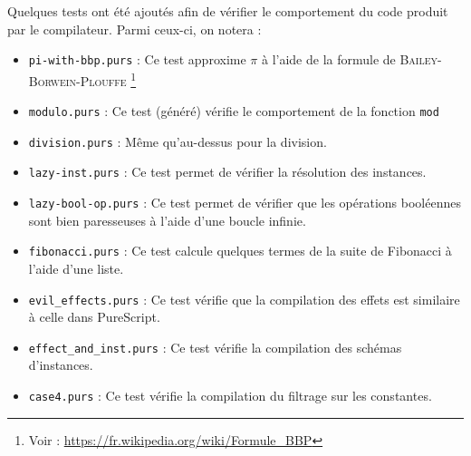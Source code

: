 \documentclass[french, 12pt]{article}
\newcommand{\ps}{\textsf{PureScript}}
\begin{document}
Quelques tests ont été ajoutés afin de vérifier le comportement du code produit
par le compilateur. Parmi ceux-ci, on notera :
\begin{itemize}
    \item \texttt{pi-with-bbp.purs} : Ce test approxime $\pi$ à l'aide de la
          formule de \textsc{Bailey}-\textsc{Borwein}-\textsc{Plouffe}%
          \footnote{Voir : \url{https://fr.wikipedia.org/wiki/Formule_BBP}}
    \item \texttt{modulo.purs} : Ce test (généré) vérifie le comportement de la
          fonction \texttt{mod}
    \item \texttt{division.purs} : Même qu'au-dessus pour la division.
    \item \texttt{lazy-inst.purs} : Ce test permet de vérifier la résolution des
          instances.
    \item \texttt{lazy-bool-op.purs} : Ce test permet de vérifier que les
          opérations booléennes sont bien paresseuses à l'aide d'une boucle infinie.
    \item \texttt{fibonacci.purs} : Ce test calcule quelques termes de la suite
          de Fibonacci à l'aide d'une liste.
    \item \texttt{evil\_effects.purs} : Ce test vérifie que la compilation des
          effets est similaire à celle dans \ps.
    \item \texttt{effect\_and\_inst.purs} : Ce test vérifie la compilation des
          schémas d'instances.
    \item \texttt{case4.purs} : Ce test vérifie la compilation du filtrage sur
          les constantes.
\end{itemize}
\end{document}
